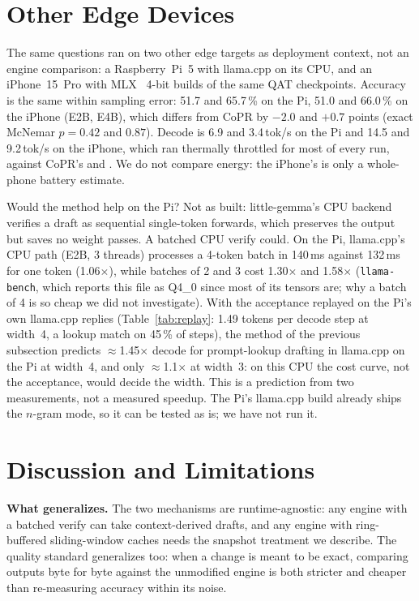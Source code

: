 \documentclass[conference]{IEEEtran}
\newcommand{\sys}{CoPR}
\newcommand{\lc}{llama.cpp}
\newcommand{\lgm}{little-gemma}
\begin{document}
\section{Other Edge Devices}\label{sec:devices}

The same questions ran on two other edge targets as deployment context, not an
engine comparison: a Raspberry~Pi~5 with \lc{} on its CPU, and an iPhone~15~Pro
with MLX~\cite{mlx} 4-bit builds of the same QAT checkpoints. Accuracy is the
same within sampling error: 51.7 and 65.7\,\% on the Pi, 51.0 and 66.0\,\% on the
iPhone (E2B, E4B), which differs from \sys{} by $-2.0$ and $+0.7$ points (exact
McNemar $p{=}0.42$ and $0.87$). Decode is 6.9 and 3.4\,tok/s on the Pi and 14.5
and 9.2\,tok/s on the iPhone, which ran thermally throttled for most of every
run, against \sys{}'s \EtwoDecA{} and \EfourDecA{}. We do not compare energy: the
iPhone's is only a whole-phone battery estimate.

Would the method help on the Pi? Not as built: \lgm{}'s CPU backend verifies a
draft as sequential single-token forwards, which preserves the output but saves
no weight passes. A batched CPU verify could. On the Pi, \lc{}'s CPU path
(E2B, 3 threads) processes a 4-token batch in 140\,ms against 132\,ms for one
token (1.06$\times$), while batches of 2 and 3 cost 1.30$\times$ and
1.58$\times$ (\texttt{llama-bench}, which reports this file as Q4\_0 since most
of its tensors are; why a batch of 4 is so cheap we did not investigate). With the acceptance replayed on the Pi's own \lc{}
replies (Table~\ref{tab:replay}: 1.49 tokens per decode step at width~4, a lookup
match on 45\,\% of steps), the method of the previous subsection predicts
$\approx$1.45$\times$ decode for prompt-lookup drafting in \lc{} on the Pi at
width~4, and only $\approx$1.1$\times$ at width~3: on this CPU the cost curve,
not the acceptance, would decide the width. This is a prediction from two
measurements, not a measured speedup. The Pi's \lc{} build already ships the
$n$-gram mode, so it can be tested as is; we have not run it.

\section{Discussion and Limitations}\label{sec:limits}

\textbf{What generalizes.} The two mechanisms are runtime-agnostic: any engine
with a batched verify can take context-derived drafts, and any engine with
ring-buffered sliding-window caches needs the snapshot treatment we describe.
The quality standard generalizes too: when a change is meant to be exact,
comparing outputs byte for byte against the unmodified engine is both stricter
and cheaper than re-measuring accuracy within its noise.
\end{document}
